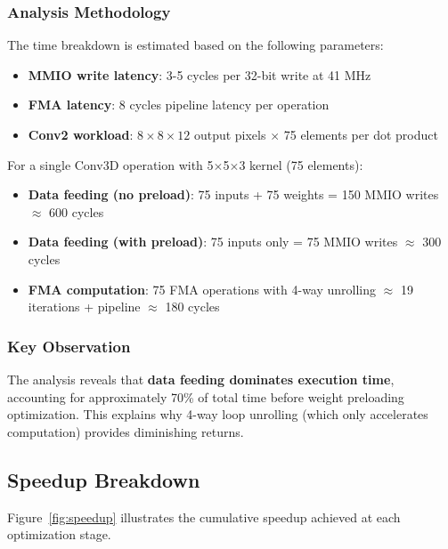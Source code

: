 \documentclass[conference]{IEEEtran}
\begin{document}
\subsubsection{Analysis Methodology}
The time breakdown is estimated based on the following parameters:
\begin{itemize}
    \item \textbf{MMIO write latency}: 3-5 cycles per 32-bit write at 41 MHz
    \item \textbf{FMA latency}: 8 cycles pipeline latency per operation
    \item \textbf{Conv2 workload}: $8 \times 8 \times 12$ output pixels $\times$ 75 elements per dot product
\end{itemize}

For a single Conv3D operation with 5$\times$5$\times$3 kernel (75 elements):
\begin{itemize}
    \item \textbf{Data feeding (no preload)}: 75 inputs + 75 weights = 150 MMIO writes $\approx$ 600 cycles
    \item \textbf{Data feeding (with preload)}: 75 inputs only = 75 MMIO writes $\approx$ 300 cycles
    \item \textbf{FMA computation}: 75 FMA operations with 4-way unrolling $\approx$ 19 iterations + pipeline $\approx$ 180 cycles
\end{itemize}

\subsubsection{Key Observation}
The analysis reveals that \textbf{data feeding dominates execution time}, accounting for approximately 70\% of total time before weight preloading optimization. This explains why 4-way loop unrolling (which only accelerates computation) provides diminishing returns.

\subsection{Speedup Breakdown}

Figure~\ref{fig:speedup} illustrates the cumulative speedup achieved at each optimization stage.
\end{document}

